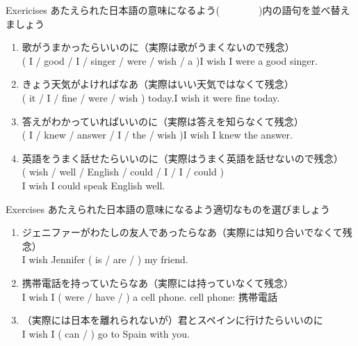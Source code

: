 \documentclass[aspectratio=169,xcolor={dvipsnames,table}]{beamer}
\begin{document}
\begin{frame}[plain]{Exericises}
 あたえられた日本語の意味になるよう(~~~~~~~~)内の語句を並べ替えましょう\mbox{}\hfill{} 


\begin{enumerate}
 \item 歌がうまかったらいいのに（実際は歌がうまくないので残念）\\
( I / good / I / singer / were / wish / a )\hfill{}I wish I were a good singer.
 \item きょう天気がよければなあ（実際はいい天気ではなくて残念）\\
( it / I / fine / were / wish ) today.\hfill{}I wish it were fine today.
 \item 答えがわかっていればいいのに（実際は答えを知らなくて残念）\\
( I / knew / answer / I / the / wish )\hfill{}I wish I knew the answer.
 \item 英語をうまく話せたらいいのに（実際はうまく英語を話せないので残念）\\
( wish / well / English / could / I / I / could )\\
\hfill{}I wish I could speak English well.
\end{enumerate}
\end{frame}
\begin{frame}[plain]{Exercises}
 あたえられた日本語の意味になるよう適切なものを選びましょう\mbox{}\hfill{} 


\begin{enumerate}
 \item ジェニファーがわたしの友人であったらなあ（実際には知り合いでなくて残念）\\
I wish Jennifer ( is / are /  ) my friend.
 \item 携帯電話を持っていたらなあ（実際には持っていなくて残念）\\
I wish I ( were / have /  ) a cell phone.%
\hfill{}cell phone: {\scriptsize 携帯電話}
 \item （実際には日本を離れられないが）君とスペインに行けたらいいのに\\
I wish I ( can /  ) go to Spain with you.
\end{enumerate}
\end{frame}
\end{document}
